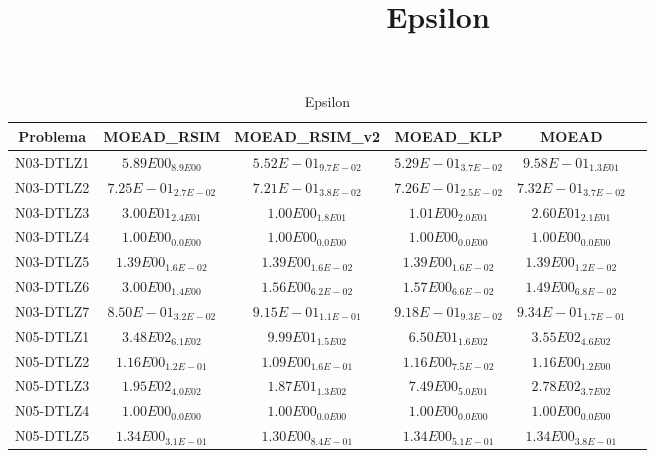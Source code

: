 \documentclass{article}
\title{Epsilon}
\author{}
\begin{document}
\maketitle
\begin{table*}[ht!]
\scriptsize
\caption{Epsilon}
\centering\begin{tabular}{|c||c||c||c||c||c|} \hline
Problema &MOEAD_RSIM &MOEAD_RSIM_v2 &MOEAD_KLP &MOEAD\\\hline
N03-DTLZ1 &$5.89E00_{8.9E00}$ &\cellcolor{gray25}$5.52E-01_{9.7E-02}$ &\cellcolor{gray95}$5.29E-01_{3.7E-02}$ &$9.58E-01_{1.3E01}$\\ 
\hline
N03-DTLZ2 &\cellcolor{gray25}$7.25E-01_{2.7E-02}$ &\cellcolor{gray95}$7.21E-01_{3.8E-02}$ &$7.26E-01_{2.5E-02}$ &$7.32E-01_{3.7E-02}$\\ 
\hline
N03-DTLZ3 &$3.00E01_{2.4E01}$ &\cellcolor{gray95}$1.00E00_{1.8E01}$ &\cellcolor{gray25}$1.01E00_{2.0E01}$ &$2.60E01_{2.1E01}$\\ 
\hline
N03-DTLZ4 &\cellcolor{gray95}$1.00E00_{0.0E00}$ &\cellcolor{gray25}$1.00E00_{0.0E00}$ &$1.00E00_{0.0E00}$ &$1.00E00_{0.0E00}$\\ 
\hline
N03-DTLZ5 &$1.39E00_{1.6E-02}$ &$1.39E00_{1.6E-02}$ &\cellcolor{gray95}$1.39E00_{1.6E-02}$ &\cellcolor{gray25}$1.39E00_{1.2E-02}$\\ 
\hline
N03-DTLZ6 &$3.00E00_{1.4E00}$ &\cellcolor{gray25}$1.56E00_{6.2E-02}$ &$1.57E00_{6.6E-02}$ &\cellcolor{gray95}$1.49E00_{6.8E-02}$\\ 
\hline
N03-DTLZ7 &\cellcolor{gray95}$8.50E-01_{3.2E-02}$ &\cellcolor{gray25}$9.15E-01_{1.1E-01}$ &$9.18E-01_{9.3E-02}$ &$9.34E-01_{1.7E-01}$\\ 
\hline
N05-DTLZ1 &$3.48E02_{6.1E02}$ &\cellcolor{gray25}$9.99E01_{1.5E02}$ &\cellcolor{gray95}$6.50E01_{1.6E02}$ &$3.55E02_{4.6E02}$\\ 
\hline
N05-DTLZ2 &$1.16E00_{1.2E-01}$ &\cellcolor{gray95}$1.09E00_{1.6E-01}$ &\cellcolor{gray25}$1.16E00_{7.5E-02}$ &$1.16E00_{1.2E00}$\\ 
\hline
N05-DTLZ3 &$1.95E02_{4.0E02}$ &\cellcolor{gray25}$1.87E01_{1.3E02}$ &\cellcolor{gray95}$7.49E00_{5.0E01}$ &$2.78E02_{3.7E02}$\\ 
\hline
N05-DTLZ4 &\cellcolor{gray95}$1.00E00_{0.0E00}$ &\cellcolor{gray25}$1.00E00_{0.0E00}$ &$1.00E00_{0.0E00}$ &$1.00E00_{0.0E00}$\\ 
\hline
N05-DTLZ5 &$1.34E00_{3.1E-01}$ &\cellcolor{gray95}$1.30E00_{8.4E-01}$ &$1.34E00_{5.1E-01}$ &\cellcolor{gray25}$1.34E00_{3.8E-01}$\\ 
\hline

\end{tabular}
\end{table*}
\end{document}
